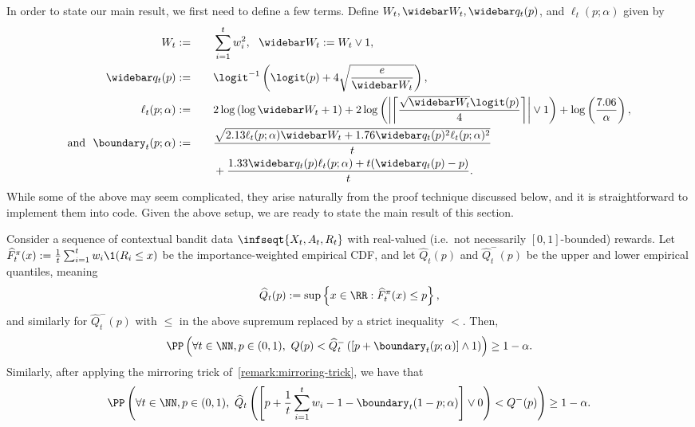 In order to state our main result, we first need to define a few terms. Define $W_t, \widebar W_t, \widebar q_t(p)$, and $\ell_t(p; \alpha)$ given by
\begin{alignat}{2}
  W_t &:= \quad &&\sum_{i=1}^t w_i^2 , ~~ \widebar W_t := W_t \lor 1,~~ \\ 
  \widebar q_t(p) &:= \quad &&\logit^{-1} \left ( \logit(p) + 4 \sqrt{\frac{e}{\widebar W_t}} \right ),\\
  \ell_t(p; \alpha) &:= \quad &&2\log \left ( \log \widebar W_t + 1\right ) + 2\log \left ( \left |  \left \lceil \frac{ \sqrt{\widebar W_t}\logit(p)}{4} \right \rceil \right |  \lor 1\right )+\log \left ( \frac{7.06}{\alpha} \right ),\\
  \text{and}~~\boundary_t(p; \alpha) &:= \quad &&\frac{\sqrt{2.13 \ell_t(p; \alpha) \widebar W_t + 1.76 \widebar q_t(p)^2 \ell_t(p; \alpha)^2}}{t} \\
      & \quad && + \frac{1.33 \widebar q_t(p) \ell_t(p; \alpha) + t(\widebar q_t(p) - p)}{t}.
\end{alignat}
While some of the above may seem complicated, they arise naturally from the proof technique discussed below, and it is straightforward to implement them into code. 
Given the above setup, we are ready to state the main result of this section.
\begin{theorem}\label{theorem:cdf}
    Consider a sequence of contextual bandit data $\infseqt{X_t, A_t, R_t}$ with real-valued (i.e.~not necessarily $[0, 1]$-bounded) rewards.
  Let $\widehat F_t^\pi(x) := \frac{1}{t}\sum_{i=1}^t w_i \1(R_i \leq x)$ be the importance-weighted empirical CDF\@, and let $\widehat Q_t(p)$ and $\widehat Q^-_t(p)$ be the upper and lower empirical quantiles, meaning
  \begin{equation}
  \widehat Q_t(p) := \sup \left \{ x \in \RR : \widehat F_t^\pi(x) \leq p \right \}, 
  \end{equation}
  and similarly for $\widehat Q_t^-(p)$ with $\leq$ in the above supremum replaced by a strict inequality $<$.
  Then, 
  \begin{align}
    \PP \left ( \forall t \in \NN, p \in (0, 1),\ Q(p) < \widehat Q_t^- \left ([p + \boundary_t(p; \alpha)]\land 1  \right )  \right ) \geq 1-\alpha.\label{eq:lower-bound-Q(p)}
  \end{align}
  Similarly, after applying the mirroring trick of~\cref{remark:mirroring-trick}, we have that
  \begin{equation}
    \PP \left ( \forall t \in \NN, p \in (0, 1),\ \widehat Q_t \left (\left [p + \frac{1}{t}\sum_{i=1}^t w_i - 1 - \boundary_t(1-p; \alpha) \right ] \lor 0\right ) < Q^-(p)  \right ) \geq 1-\alpha.\label{eq:upper-bound-Q(p)}
  \end{equation}
\end{theorem}

